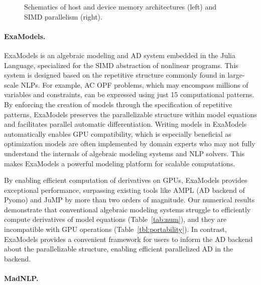 \begin{figure}[t]
{
  }
  \caption{Schematics of host and device memory architectures (left) and SIMD parallelism (right).}
  \label{fig:simd}
\end{figure}


\paragraph{ExaModels.}

ExaModels is an algebraic modeling and AD system embedded in the Julia
Language, specialized for the SIMD abstraction of nonlinear
programs. This system is designed based on the repetitive structure
commonly found in large-scale NLPs. For example, AC OPF problems,
which may encompass millions of variables and constraints, can be expressed
using just 15 computational patterns. By enforcing the creation of
models through the specification of repetitive patterns, ExaModels preserves the
parallelizable structure within model equations and facilitates
parallel automatic differentiation. Writing models in ExaModels
automatically enables GPU compatibility, which is especially
beneficial as optimization models are often implemented by domain
experts who may not fully understand the internals of algebraic
modeling systems and NLP solvers.  This makes ExaModels a powerful
modeling platform for scalable computations.


By enabling efficient computation of derivatives on GPUs, ExaModels
provides exceptional performance, surpassing existing tools like AMPL
(AD backend of Pyomo) and JuMP by more than two orders of
magnitude. Our numerical results demonstrate that conventional
algebraic modeling systems struggle to efficiently compute derivatives
of model equations (Table~\ref{tab:num}), and they are incompatible
with GPU operations (Table~\ref{tbl:portability}). In contrast,
ExaModels provides a convenient framework for users to inform the AD
backend about the parallelizable structure, enabling efficient
parallelized AD in the backend.


\paragraph{MadNLP.}

